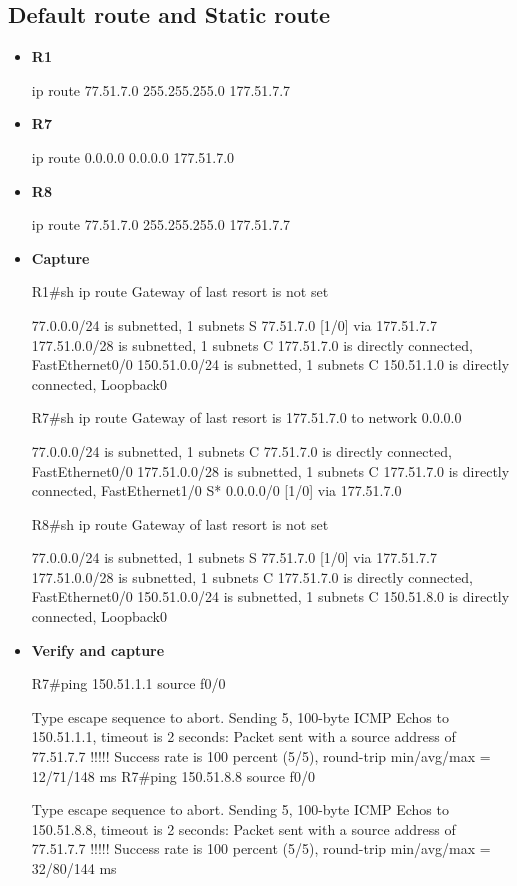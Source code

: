 \documentclass[10pt]{article}
\begin{document}
\subsection{Default route and Static route}
\begin{itemize}
\item {\bf R1}
\begin{verbatim*}
ip route 77.51.7.0 255.255.255.0 177.51.7.7
\end{verbatim*}
\item {\bf R7}
\begin{verbatim*}
ip route 0.0.0.0 0.0.0.0 177.51.7.0
\end{verbatim*}
\item {\bf R8}
\begin{verbatim*}
ip route 77.51.7.0 255.255.255.0 177.51.7.7
\end{verbatim*}
\item {\bf Capture}
\begin{verbatim*}
R1#sh ip route
Gateway of last resort is not set

77.0.0.0/24 is subnetted, 1 subnets
S       77.51.7.0 [1/0] via 177.51.7.7
177.51.0.0/28 is subnetted, 1 subnets
C       177.51.7.0 is directly connected, FastEthernet0/0
150.51.0.0/24 is subnetted, 1 subnets
C       150.51.1.0 is directly connected, Loopback0

R7#sh ip route
Gateway of last resort is 177.51.7.0 to network 0.0.0.0

77.0.0.0/24 is subnetted, 1 subnets
C       77.51.7.0 is directly connected, FastEthernet0/0
177.51.0.0/28 is subnetted, 1 subnets
C       177.51.7.0 is directly connected, FastEthernet1/0
S*   0.0.0.0/0 [1/0] via 177.51.7.0


R8#sh ip route
Gateway of last resort is not set

77.0.0.0/24 is subnetted, 1 subnets
S       77.51.7.0 [1/0] via 177.51.7.7
177.51.0.0/28 is subnetted, 1 subnets
C       177.51.7.0 is directly connected, FastEthernet0/0
150.51.0.0/24 is subnetted, 1 subnets
C       150.51.8.0 is directly connected, Loopback0
\end{verbatim*}
\item {\bf Verify and capture}
\begin{verbatim*}
R7#ping 150.51.1.1 source f0/0

Type escape sequence to abort.
Sending 5, 100-byte ICMP Echos to 150.51.1.1, timeout is 2 seconds:
Packet sent with a source address of 77.51.7.7
!!!!!
Success rate is 100 percent (5/5), round-trip min/avg/max = 12/71/148 ms
R7#ping 150.51.8.8 source f0/0

Type escape sequence to abort.
Sending 5, 100-byte ICMP Echos to 150.51.8.8, timeout is 2 seconds:
Packet sent with a source address of 77.51.7.7
!!!!!
Success rate is 100 percent (5/5), round-trip min/avg/max = 32/80/144 ms
\end{verbatim*}
\end{itemize}
\end{document}
